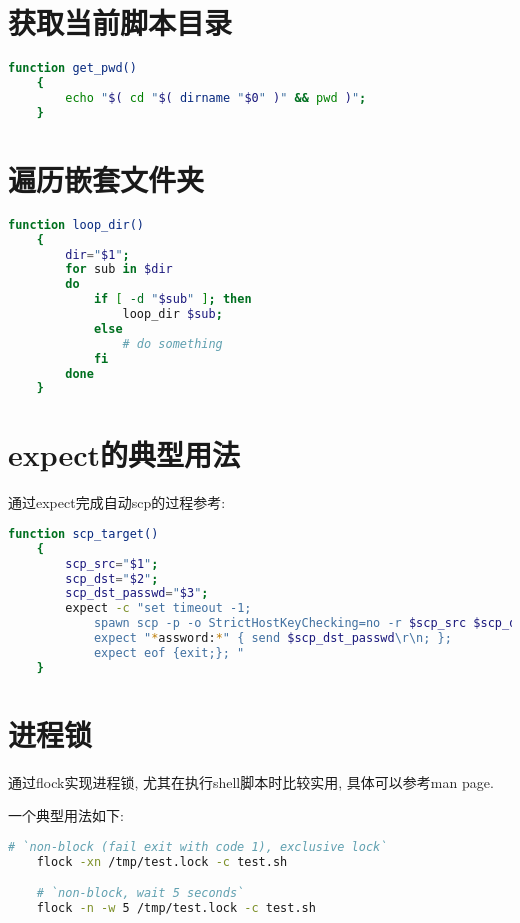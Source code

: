 \section {\ZHH 获取当前脚本目录} {
    \begin{lstlisting}[language=bash]
    function get_pwd()
    {
        echo "$( cd "$( dirname "$0" )" && pwd )";
    }
    \end{lstlisting}
}


\section {\ZHH 遍历嵌套文件夹} {
    \begin{lstlisting}[language=bash]
    function loop_dir()
    {
        dir="$1";
        for sub in $dir
        do
            if [ -d "$sub" ]; then
                loop_dir $sub;
            else
                # do something
            fi
        done
    }
    \end{lstlisting}
}


\section {\ZHH expect的典型用法} {
    {通过expect完成自动scp的过程参考: }\par
    \begin{lstlisting}[language=bash]
    function scp_target()
    {
        scp_src="$1";
        scp_dst="$2";
        scp_dst_passwd="$3";
        expect -c "set timeout -1;
            spawn scp -p -o StrictHostKeyChecking=no -r $scp_src $scp_dst;
            expect "*assword:*" { send $scp_dst_passwd\r\n; }; 
            expect eof {exit;}; "
    }
    \end{lstlisting}
}

\section {\ZHH 进程锁} {
    {通过flock实现进程锁, 尤其在执行shell脚本时比较实用, 具体可以参考man page. }\par
    {一个典型用法如下: }\par
    \begin{lstlisting}[language=bash]
    # `non-block (fail exit with code 1), exclusive lock`
    flock -xn /tmp/test.lock -c test.sh

    # `non-block, wait 5 seconds`
    flock -n -w 5 /tmp/test.lock -c test.sh
    \end{lstlisting}
}


